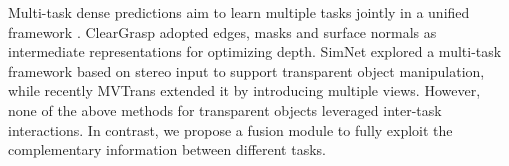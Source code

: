 Multi-task dense predictions aim to learn multiple tasks jointly in a unified framework \cite{c42,c28,c33}. ClearGrasp \cite{c7} adopted edges, masks and surface normals as intermediate representations for optimizing depth. SimNet explored a multi-task framework based on stereo input to support transparent object manipulation, while recently MVTrans \cite{c15} extended it by introducing multiple views. However, none of the above methods for transparent objects leveraged inter-task interactions. In contrast, we propose a fusion module to fully exploit the complementary information between different tasks.





